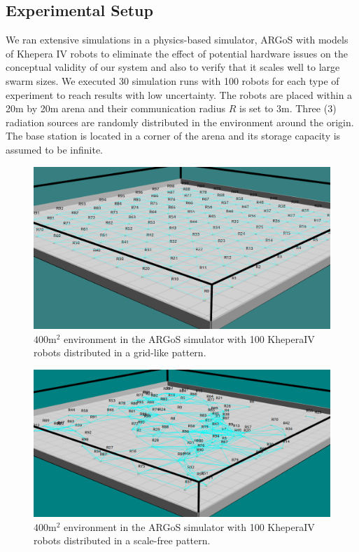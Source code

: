\subsection{Experimental Setup}
\label{rassSetup}

We ran extensive simulations in a physics-based simulator, ARGoS
\cite{Pinciroli:SI2012} with models of Khepera IV
\cite{kteam2021kheperaiv} robots to eliminate the effect of potential
hardware issues on the conceptual validity of our system and also to
verify that it scales well to large swarm sizes. We executed 30 simulation
runs with 100 robots for each type of experiment to reach results
with low uncertainty. The robots are placed within a 20m by 20m arena and their communication radius $R$ is set to 3m. Three (3) radiation sources are randomly distributed in the environment around the origin. The base station is located in a corner of the arena and its storage capacity is assumed to be infinite. 

\begin{figure}[htbp]
	\centering
    \includegraphics[width=\columnwidth]{figures/dora_mesh/argos_grid_link.png}
    \caption[Grid formation in ARGoS]{$400 \text{m}^2$ environment in the ARGoS simulator with 100 KheperaIV robots distributed in a grid-like pattern.}
    \label{argos:grid}
\end{figure}

\begin{figure}[htbp]
	\centering
    \includegraphics[width=\columnwidth]{figures/dora_mesh/argos_scale_free.png}
    \caption[Scale-free formation in ARGoS]{$400 \text{m}^2$ environment in the ARGoS simulator with 100 KheperaIV robots distributed in a scale-free pattern.}
    \label{argos:scale-free}
\end{figure}

